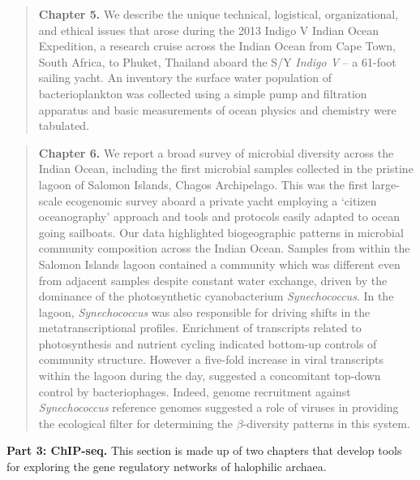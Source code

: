 \begin{quote} \noindent\textbf{Chapter 5.} We describe the unique technical,
logistical, organizational, and ethical issues that arose during the 2013
Indigo V Indian Ocean Expedition, a research cruise across the Indian Ocean
from Cape Town, South Africa, to Phuket, Thailand aboard the S/Y {\em Indigo
V} -- a 61-foot sailing yacht. An inventory the surface water population of
bacterioplankton was collected using a simple pump and filtration apparatus
and basic measurements of ocean physics and chemistry were
tabulated.\end{quote}

\begin{quote} \noindent\textbf{Chapter 6.} We report a broad survey of
microbial diversity across the Indian Ocean, including the first microbial
samples collected in the pristine lagoon of Salomon Islands, Chagos
Archipelago. This was the first large-scale ecogenomic survey aboard a private
yacht employing a `citizen oceanography' approach and tools and protocols
easily adapted to ocean going sailboats. Our data highlighted biogeographic
patterns in microbial community composition across the Indian Ocean. Samples
from within the Salomon Islands lagoon contained a community which was
different even from adjacent samples despite constant water exchange, driven
by the dominance of the photosynthetic cyanobacterium {\em Synechococcus}. In
the lagoon, {\em Synechococcus} was also responsible for driving shifts in the
metatranscriptional profiles. Enrichment of transcripts related to
photosynthesis and nutrient cycling indicated bottom-up controls of community
structure. However a five-fold increase in viral transcripts within the lagoon
during the day, suggested a concomitant top-down control by bacteriophages.
Indeed, genome recruitment against {\em Synechococcus} reference genomes
suggested a role of viruses in providing the ecological filter for determining
the $\beta$-diversity patterns in this system. \end{quote}

\noindent\textbf{Part 3: ChIP-seq.}
This section is made up of two chapters that develop tools for exploring the gene regulatory networks of halophilic archaea. %

